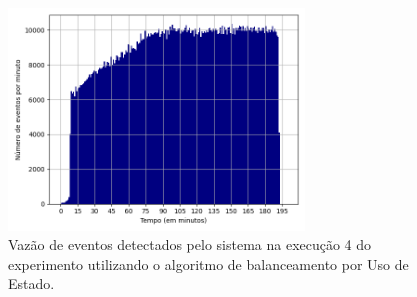 






\begin{figure}[h]
\centering
\includegraphics[width=0.7\textwidth]{figuras/graphics/histogram_vazao_9-dez-su.png}
\caption{Vazão de eventos detectados pelo sistema na execução 4 do experimento utilizando o algoritmo de balanceamento por Uso de Estado.}
\label{fig:vazao_9-dez-su}
\end{figure}



